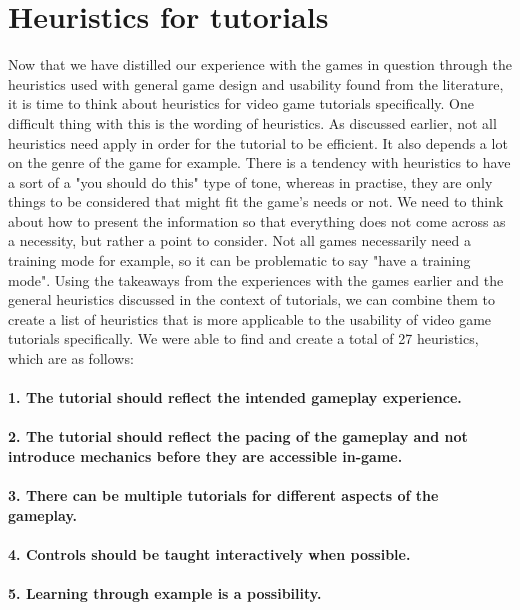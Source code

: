 \section{Heuristics for tutorials}
Now that we have distilled our experience with the games in question through the heuristics used with general game design and usability found from the literature, it is time to think about heuristics for video game tutorials specifically. One difficult thing with this is the wording of heuristics. As discussed earlier, not all heuristics need apply in order for the tutorial to be efficient. It also depends a lot on the genre of the game for example. There is a tendency with heuristics to have a sort of a "you should do this" type of tone, whereas in practise, they are only things to be considered that might fit the game's needs or not. We need to think about how to present the information so that everything does not come across as a necessity, but rather a point to consider. Not all games necessarily need a training mode for example, so it can be problematic to say "have a training mode". Using the takeaways from the experiences with the games earlier and the general heuristics discussed in the context of tutorials, we can combine them to create a list of heuristics that is more applicable to the usability of video game tutorials specifically. We were able to find and create a total of 27 heuristics, which are as follows:

\paragraph{1. The tutorial should reflect the intended gameplay experience.} 
\paragraph{2. The tutorial should reflect the pacing of the gameplay and not introduce mechanics before they are accessible in-game.}
\paragraph{3. There can be multiple tutorials for different aspects of the gameplay.}
\paragraph{4. Controls should be taught interactively when possible.}
\paragraph{5. Learning through example is a possibility.}
